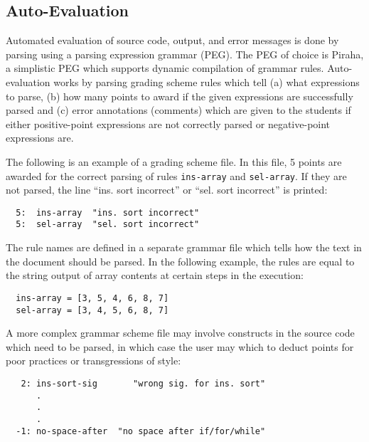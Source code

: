 \subsection{Auto-Evaluation}

Automated evaluation of source code, output, and error messages is done by
parsing using a parsing expression grammar (PEG).  The PEG of choice is Piraha,
a simplistic PEG which supports dynamic compilation of grammar rules.
Auto-evaluation works by parsing grading scheme rules which tell (a) what
expressions to parse, (b) how many points to award if the given expressions are
successfully parsed and (c) error annotations (comments) which are given to the
students if either positive-point expressions are not correctly parsed or
negative-point expressions are.  

The following is an example of a grading scheme file.  In this file, 5 points
are awarded for the correct parsing of rules \texttt{ins-array} and
\texttt{sel-array}.  If they are not parsed, the line ``ins. sort incorrect''
or ``sel. sort incorrect'' is printed:

\vspace{4pt}
\small
  \begin{Verbatim}
  5:  ins-array  "ins. sort incorrect"
  5:  sel-array  "sel. sort incorrect"
  \end{Verbatim}
\normalsize
\vspace{4pt}

The rule names are defined in a separate grammar file which tells how the text
in the document should be parsed. In the following example, the rules are equal
to the string output of array contents at certain steps in the execution:

\vspace{4pt}
\small
\begin{Verbatim}
  ins-array = [3, 5, 4, 6, 8, 7]
  sel-array = [3, 4, 5, 6, 8, 7]
\end{Verbatim}
\normalsize
\vspace{4pt}

A more complex grammar scheme file may involve constructs in the source code
which need to be parsed, in which case the user may which to deduct points
for poor practices or transgressions of style:

\vspace{4pt}
\footnotesize
\begin{Verbatim}
   2: ins-sort-sig       "wrong sig. for ins. sort"
      .
      .
      .
  -1: no-space-after  "no space after if/for/while"
\end{Verbatim}
\normalsize
\vspace{4pt}


